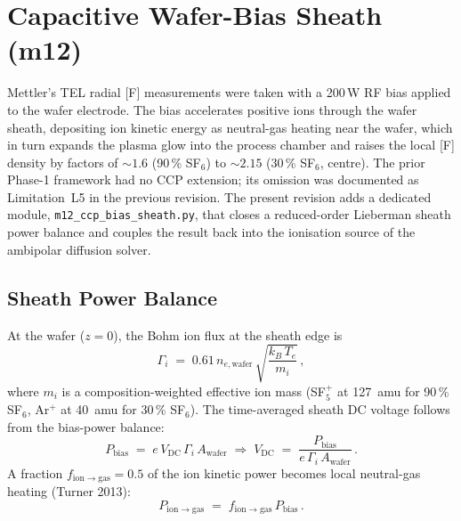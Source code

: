 \documentclass[11pt,a4paper]{report}
\begin{document}
\section{Capacitive Wafer-Bias Sheath (m12)}
\label{sec:m12-bias-sheath}

Mettler's TEL radial [F] measurements were taken with a 200\,W RF bias applied to the wafer electrode.  The bias accelerates positive ions through the wafer sheath, depositing ion kinetic energy as neutral-gas heating near the wafer, which in turn expands the plasma glow into the process chamber and raises the local [F] density by factors of $\sim 1.6$ (90\,\% SF$_6$) to $\sim 2.15$ (30\,\% SF$_6$, centre).  The prior Phase-1 framework had no CCP extension; its omission was documented as Limitation~L5 in the previous revision.  The present revision adds a dedicated module, \texttt{m12\_ccp\_bias\_sheath.py}, that closes a reduced-order Lieberman sheath power balance and couples the result back into the ionisation source of the ambipolar diffusion solver.

\subsection{Sheath Power Balance}

At the wafer ($z=0$), the Bohm ion flux at the sheath edge is
\begin{equation}
  \Gamma_i \;=\; 0.61\,n_{e,\mathrm{wafer}}\,\sqrt{\frac{k_B\,T_e}{m_i}}\,,
  \label{eq:bohm-flux}
\end{equation}
where $m_i$ is a composition-weighted effective ion mass (SF$_5^+$ at 127~amu for 90\,\% SF$_6$, Ar$^+$ at 40~amu for 30\,\% SF$_6$).  The time-averaged sheath DC voltage follows from the bias-power balance:
\begin{equation}
  P_\mathrm{bias} \;=\; e\,V_\mathrm{DC}\,\Gamma_i\,A_\mathrm{wafer} \;\Rightarrow\; V_\mathrm{DC} \;=\; \frac{P_\mathrm{bias}}{e\,\Gamma_i\,A_\mathrm{wafer}}\,.
  \label{eq:sheath-Vdc}
\end{equation}
A fraction $f_\mathrm{ion\to gas}=0.5$ of the ion kinetic power becomes local neutral-gas heating (Turner 2013):
\begin{equation}
  P_\mathrm{ion\to gas} \;=\; f_\mathrm{ion\to gas}\,P_\mathrm{bias}\,.
  \label{eq:ion-to-gas}
\end{equation}
\end{document}
